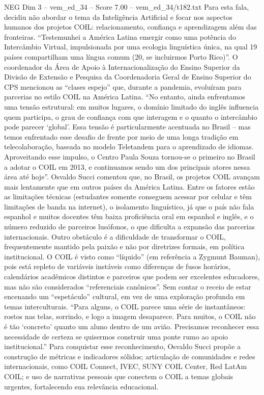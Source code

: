 \begin{textsample}{NEG Dim 3 – vem\_ed\_34 – Score 7.00 – vem\_ed\_34/t182.txt}
Para esta fala, decidiu não abordar o tema da Inteligência Artificial e focar nos aspectos humanos dos projetos COIL: relacionamento, confiança e aprendizagem além das fronteiras. “Testemunhei a América Latina emergir como uma potência do Intercâmbio Virtual, impulsionada por uma ecologia linguística única, na qual 19 países compartilham uma língua comum (20, se incluirmos Porto Rico)”.
O coordenador da Área de Apoio à Internacionalização do Ensino Superior da Divisão de Extensão e Pesquisa da Coordenadoria Geral de Ensino Superior do CPS mencionou as “clases espejo” que, durante a pandemia, evoluíram para parcerias no estilo COIL na América Latina. “No entanto, ainda enfrentamos uma tensão estrutural: em muitos lugares, o domínio limitado do inglês influencia quem participa, o grau de confiança com que interagem e o quanto o intercâmbio pode parecer ‘global’.
Essa tensão é particularmente acentuada no Brasil – mas temos enfrentado esse desafio de frente por meio de uma longa tradição em telecolaboração, baseada no modelo Teletandem para o aprendizado de idiomas.
Aproveitando esse impulso, o Centro Paula Souza tornou-se o primeiro no Brasil a adotar o COIL em 2013, e continuamos sendo um dos principais atores nessa área até hoje”.
Osvaldo Succi comentou que, no Brasil, os projetos COIL avançam mais lentamente que em outros países da América Latina.
Entre os fatores estão as limitações técnicas (estudantes somente conseguem acessar por celular e têm limitações de banda na internet), o isolamento linguístico, já que o país não fala espanhol e muitos docentes têm baixa proficiência oral em espanhol e inglês, e o número reduzido de parceiros lusófonos, o que dificulta a expansão das parcerias internacionais.
Outro obstáculo é a dificuldade de transformar o COIL, frequentemente mantido pela paixão e não por diretrizes formais, em política institucional.
O COIL é visto como “líquido” (em referência a Zygmunt Bauman), pois está repleto de variáveis instáveis como diferenças de fusos horários, calendários acadêmicos distintos e parceiros que podem ser excelentes educadores, mas não são considerados “referenciais canônicos”.
Sem contar o receio de estar encenando um “espetáculo” cultural, em vez de uma exploração profunda em temas interculturais. “Para alguns, o COIL parece uma série de instantâneos: rostos nas telas, sorrindo, e logo a imagem desaparece.
Para muitos, o COIL não é tão ‘concreto’ quanto um aluno dentro de um avião.
Precisamos reconhecer essa necessidade de certeza se quisermos construir uma ponte rumo ao apoio institucional.” Para conquistar esse reconhecimento, Osvaldo Succi propõe a construção de métricas e indicadores sólidos; articulação de comunidades e redes internacionais, como COIL Connect, IVEC, SUNY COIL Center, Red LatAm COIL; e uso de narrativas pessoais que conectem o COIL a temas globais urgentes, fortalecendo sua relevância educacional.

\end{textsample}
